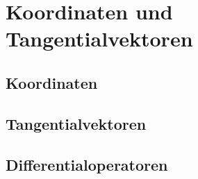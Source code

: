 %
%
%
\chapter{Koordinaten und Tangentialvektoren
\label{chapter:koordinaten}}

%
%
\section{Koordinaten
\label{buch:koordinaten:section:koordinaten}}

%
%
\section{Tangentialvektoren
\label{buch:koordinaten:section:tangentialvektoren}}

%
%
%
\section{Differentialoperatoren
\label{buch:koordinaten:section:differentialoperatoren}}
